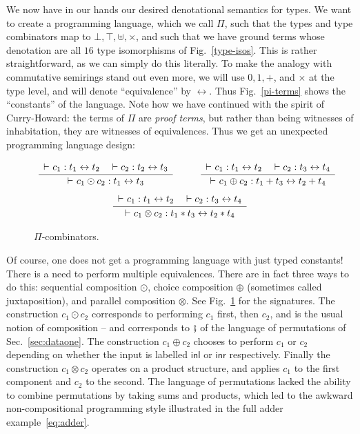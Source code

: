 \documentclass{article}
\newcommand{\iso}{\leftrightarrow}
\newcommand{\proves}{\vdash}
\newcommand{\Rule}[4]{
\makebox{{\rm #1}
$\displaystyle
\frac{\begin{array}{l}#2 \\\end{array}}
{\begin{array}{l}#3      \\\end{array}}$
 #4}}
\newcommand{\jdg}[3]{#2 \proves_{#1} #3}
\begin{document}
We now have in our hands our desired denotational semantics for types.
We want to create a programming language, which we call $\Pi$, such that the
types and type combinators map to $\bot, \top, \uplus, \times$, and
such that we have ground terms whose denotation are all $16$ type
isomorphisms of Fig.~\ref{type-isos}. This is rather
straightforward, as we can simply do this literally. To make the
analogy with commutative semirings stand out even more, we will use
$0, 1, +$, and $\times$ at the type level, and will denote
``equivalence'' by $\iso$.  Thus Fig.~\ref{pi-terms} shows the
``constants'' of the language. Note how we have continued with
the spirit of Curry-Howard: the terms of $\Pi$ are \emph{proof terms},
but rather than being witnesses of inhabitation, they are witnesses of
equivalences. Thus we get an unexpected programming language design:

\begin{center}
\end{center}
\vspace*{3mm}

\begin{figure}[t]
\[
\Rule{}
{\jdg{}{}{c_1 : t_1 \iso t_2} \quad \vdash c_2 : t_2 \iso t_3}
{\jdg{}{}{c_1 \odot c_2 : t_1 \iso t_3}}
{}
\qquad
\Rule{}
{\jdg{}{}{c_1 : t_1 \iso t_2} \quad \vdash c_2 : t_3 \iso t_4}
{\jdg{}{}{c_1 \oplus c_2 : t_1 + t_3 \iso t_2 + t_4}}
{}
\]
\[
\Rule{}
{\jdg{}{}{c_1 : t_1 \iso t_2} \quad \vdash c_2 : t_3 \iso t_4}
{\jdg{}{}{c_1 \otimes c_2 : t_1 * t_3 \iso t_2 * t_4}}
{}
\]
\caption{$\Pi$-combinators.}
\label{pi-combinators}
\end{figure}

\noindent
Of course, one does not get a programming language with just typed
constants! There is a need to perform multiple equivalences. There are
in fact three ways to do this: sequential composition $\odot$, choice
composition $\oplus$ (sometimes called juxtaposition), and parallel
composition $\otimes$. See Fig.~\ref{pi-combinators} for the
signatures. The construction $c_1 \odot c_2$ corresponds to performing
$c_1$ first, then $c_2$, and is the usual notion of composition -- and
corresponds to $\fatsemi$ of the language of permutations of
Sec.~\ref{sec:dataone}. The construction $c_1 \oplus c_2$ chooses to
perform $c_1$ or $c_2$ depending on whether the input is labelled
$\textsf{inl}$ or $\textsf{inr}$ respectively. Finally the
construction $c_1 \otimes c_2$ operates on a product structure, and
applies $c_1$ to the first component and $c_2$ to the second. The
language of permutations lacked the ability to combine permutations by
taking sums and products, which led to the awkward non-compositional
programming style illustrated in the full adder example~\ref{eq:adder}.
\end{document}
